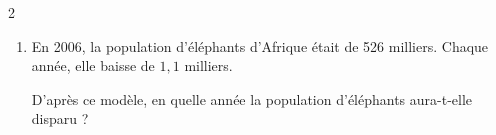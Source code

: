 \documentclass[10pt,a4paper]{article}
\begin{document}
\begin{multicols}{2}
\begin{exo}[][]
\begin{enumerate}
            Quand le réservoir sera-t-il vide ?
        \item En 2006, la population d'éléphants d'Afrique était de 526 milliers. Chaque année, elle baisse de \(1,1\) milliers.

        D'après ce modèle, en quelle année la population d'éléphants aura-t-elle disparu ?
    \end{enumerate}
\end{exo}

\end{multicols}
\end{document}
